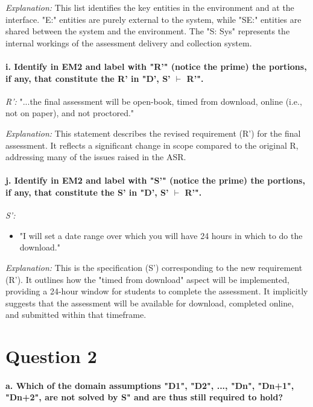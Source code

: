 \documentclass{article}
\begin{document}
\textit{Explanation:} This list identifies the key entities in the environment and at the interface. "E:" entities are purely external to the system, while "SE:" entities are shared between the system and the environment. The "S: Sys" represents the internal workings of the assessment delivery and collection system.

\paragraph{i. Identify in EM2 and label with "R'" (notice the prime) the portions, if any, that constitute the R' in "D', S' $\vdash$ R'".}

\textit{R':} "...the final assessment will be open-book, timed from download, online (i.e., not on paper), and not proctored."

\textit{Explanation:} This statement describes the revised requirement (R') for the final assessment. It reflects a significant change in scope compared to the original R, addressing many of the issues raised in the ASR.

\paragraph{j. Identify in EM2 and label with "S'" (notice the prime) the portions, if any, that constitute the S' in "D', S' $\vdash$ R'".}
\textit{S':}
\begin{itemize}
    \item "I will set a date range over which you will have 24 hours in which to do the download."
\end{itemize}

\textit{Explanation:} This is the specification (S') corresponding to the new requirement (R'). It outlines how the "timed from download" aspect will be implemented, providing a 24-hour window for students to complete the assessment. It implicitly suggests that the assessment will be available for download, completed online, and submitted within that timeframe.

\section*{Question 2}

\paragraph{a. Which of the domain assumptions "D1", "D2", ..., "Dn", "Dn+1", "Dn+2", are not solved by S" and are thus still required to hold?}
\end{document}
